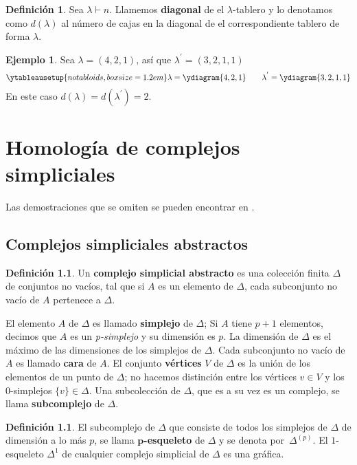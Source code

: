 \documentclass[12pt]{book}
\theoremstyle{definition}
\newtheorem{definition}[theorem]{Definición}
\newtheorem{example}[theorem]{Ejemplo}
\newcounter{in}
\newcounter{ini}
\begin{document}
\begin{definition}
  Sea $\lambda\vdash n$. Llamemos \textbf{diagonal} de el
  $\lambda$-tablero y lo denotamos como $d(\lambda)$ al número de
  cajas en la diagonal de el correspondiente tablero de forma $\lambda$.
\end{definition}

\begin{example}
  Sea $\lambda=(4,2,1)$, así que $\lambda^{'}=(3,2,1,1)$
  \begin{equation*}
    \ytableausetup{notabloids,boxsize=1.2em} 
    \lambda=\ydiagram{4,2,1} \qquad
    \lambda^{'}=\ydiagram{3,2,1,1}
  \end{equation*}
  En este caso $d(\lambda)=d(\lambda^{'})=2$.
\end{example}

\chapter{Homología de complejos simpliciales}
\label{cha:hom-com-sim}

Las demostraciones que se omiten se pueden encontrar en
\cite{munkres1984elements}.

\section{Complejos simpliciales abstractos}
\label{com-sim-abs}

\begin{definition}
Un \textbf{complejo simplicial abstracto} es una colección finita
$\Delta$ de conjuntos no vacíos, tal que si $A$ es un elemento de $\Delta$,
cada subconjunto no vacío de $A$ pertenece a $\Delta$.
\end{definition}

El elemento $A$ de $\Delta$ es llamado \textbf{simplejo} de
$\Delta$; Si $A$ tiene $p+1$ elementos, decimos que $A$ es un
\emph{p-simplejo} y su dimensión es $p$. La dimensión de $\Delta$
es el máximo de las dimensiones de los simplejos de $\Delta$. Cada
subconjunto no vacío de $A$ es llamado \textbf{cara} de $A$. El
conjunto \textbf{vértices} $V$ de $\Delta$ es la unión de los
elementos de un punto de $\Delta$; no hacemos distinción entre los
vértices $v\in V$ y los $0$-simplejos $\{v\}\in \Delta$. Una
subcolección de $\Delta$, que es a su vez es un complejo, se llama
\textbf{subcomplejo} de $\Delta$.

\begin{definition}
  El subcomplejo de $\Delta$ que consiste de todos los simplejos de
  $\Delta$ de dimensión a lo más $p$, se llama \textbf{$\boldsymbol{p}$-esqueleto} de
  $\Delta$ y se denota por~$\Delta^{(p)}$. El $1$-esqueleto
  $\Delta^{1}$ de cualquier complejo simplicial de $\Delta$ es una
  gráfica.
\end{definition}
\end{document}
